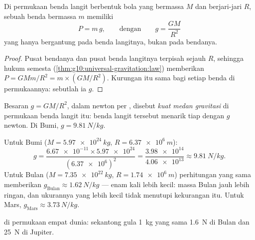 \begin{proposition}\label{prop:g10:universal-gravitation:surfaceg}
Di permukaan benda langit berbentuk bola yang bermassa $M$ dan
berjari-jari $R$, sebuah benda bermassa $m$ memiliki 
\[
P = m\,g,
\qquad\text{dengan}\qquad
g = \frac{G M}{R^2}
\]
yang hanya bergantung pada benda langitnya, bukan pada bendanya.
\end{proposition}

\begin{proof}
Pusat bendanya dan pusat benda langitnya terpisah sejauh $R$, sehingga
hukum  semesta (\cref{thm:g10:universal-gravitation:law})
memberikan $P = G M m / R^2 = m \times \left(G M / R^2\right)$. Kurungan
itu sama bagi setiap benda di permukaannya: sebutlah ia $g$.
\end{proof}

\begin{definition}\label{def:g10:universal-gravitation:fieldstrength}
Besaran $g = G M / R^2$, dalam newton per , disebut \emph{kuat
medan gravitasi} di permukaan benda langit
itu: benda langit tersebut menarik tiap  dengan $g$ newton. Di
Bumi, $g = \qty{9.81}{N/kg}$.
\end{definition}

\begin{example}[Menghitung $g$]\label{ex:g10:universal-gravitation:gvalues}
Untuk Bumi ($M = \qty{5.97e24}{kg}$, $R = \qty{6.37e6}{m}$):
\[
g = \frac{\num{6.67e-11} \times \num{5.97e24}}{(\num{6.37e6})^2}
= \frac{\num{3.98e14}}{\num{4.06e13}}
\approx \qty{9.81}{N/kg}.
\]
Untuk Bulan ($M = \qty{7.35e22}{kg}$, $R = \qty{1.74e6}{m}$)
perhitungan yang sama memberikan
$g_{\text{Bulan}} \approx \qty{1.62}{N/kg}$ --- enam kali lebih kecil:
massa Bulan jauh lebih ringan, dan ukurannya yang lebih kecil tidak
menutupi kekurangan itu. Untuk Mars,
$g_{\text{Mars}} \approx \qty{3.73}{N/kg}$.
\end{example}

\begin{omfigure}

{\small {} di permukaan empat dunia: sekantong gula
\qty{1}{kg} yang sama  \qty{1.6}{N} di Bulan dan \qty{25}{N} di
Jupiter.}
\end{omfigure}

